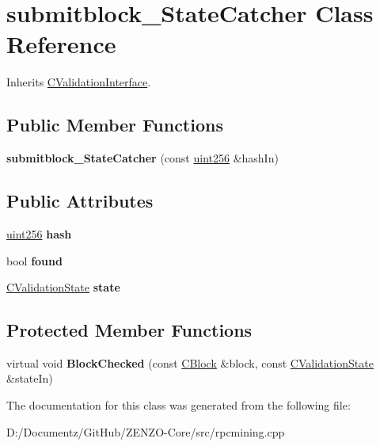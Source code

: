 \hypertarget{classsubmitblock___state_catcher}{}\section{submitblock\+\_\+\+State\+Catcher Class Reference}
\label{classsubmitblock___state_catcher}


Inherits \mbox{\hyperlink{class_c_validation_interface}{C\+Validation\+Interface}}.

\subsection*{Public Member Functions}
\begin{DoxyCompactItemize}
\item 
\mbox{\label{classsubmitblock___state_catcher_a4751e652aed4193935ed00e95cfca548}} 
{\bfseries submitblock\+\_\+\+State\+Catcher} (const \mbox{\hyperlink{classuint256}{uint256}} \&hash\+In)
\end{DoxyCompactItemize}
\subsection*{Public Attributes}
\begin{DoxyCompactItemize}
\item 
\mbox{\label{classsubmitblock___state_catcher_adcc822af0b1305bcda71f8e9656c4239}} 
\mbox{\hyperlink{classuint256}{uint256}} {\bfseries hash}
\item 
\mbox{\label{classsubmitblock___state_catcher_a61c0d03544cd4495534bdb0b52f36886}} 
bool {\bfseries found}
\item 
\mbox{\label{classsubmitblock___state_catcher_a78357802ab8d143f6f21929e0aa2d727}} 
\mbox{\hyperlink{class_c_validation_state}{C\+Validation\+State}} {\bfseries state}
\end{DoxyCompactItemize}
\subsection*{Protected Member Functions}
\begin{DoxyCompactItemize}
\item 
\mbox{\label{classsubmitblock___state_catcher_a7c7174ac1a54c80c572b115114aa2ee6}} 
virtual void {\bfseries Block\+Checked} (const \mbox{\hyperlink{class_c_block}{C\+Block}} \&block, const \mbox{\hyperlink{class_c_validation_state}{C\+Validation\+State}} \&state\+In)
\end{DoxyCompactItemize}


The documentation for this class was generated from the following file\+:\begin{DoxyCompactItemize}
\item 
D\+:/\+Documentz/\+Git\+Hub/\+Z\+E\+N\+Z\+O-\/\+Core/src/rpcmining.\+cpp\end{DoxyCompactItemize}
